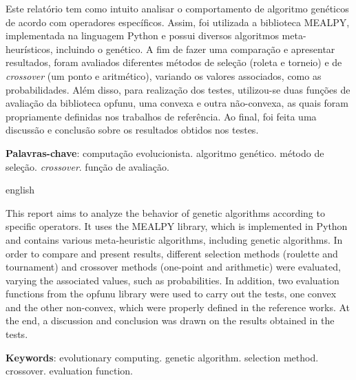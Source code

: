 \begin{resumoumacoluna}
    Este relatório tem como intuito analisar o comportamento de algoritmo genéticos de acordo com operadores específicos. Assim, foi utilizada a biblioteca MEALPY, implementada na linguagem Python e possui diversos algoritmos meta-heurísticos, incluindo o genético. A fim de fazer uma comparação e apresentar resultados, foram avaliados diferentes métodos de seleção (roleta e torneio) e de \textit{crossover} (um ponto e aritmético), variando os valores associados, como as probabilidades. Além disso, para realização dos testes, utilizou-se duas funções de avaliação da biblioteca opfunu, uma convexa e outra não-convexa, as quais foram propriamente definidas nos trabalhos de referência. Ao final, foi feita uma discussão e conclusão sobre os resultados obtidos nos testes.

    \noindent
    \textbf{Palavras-chave}: computação evolucionista. algoritmo genético. método de seleção. \textit{crossover}. função de avaliação.
\end{resumoumacoluna}

\renewcommand{\resumoname}{Abstract}
\begin{resumoumacoluna}
    \begin{otherlanguage*}{english}
    
        This report aims to analyze the behavior of genetic algorithms according to specific operators. It uses the MEALPY library, which is implemented in Python and contains various meta-heuristic algorithms, including genetic algorithms. In order to compare and present results, different selection methods (roulette and tournament) and crossover methods (one-point and arithmetic) were evaluated, varying the associated values, such as probabilities. In addition, two evaluation functions from the opfunu library were used to carry out the tests, one convex and the other non-convex, which were properly defined in the reference works. At the end, a discussion and conclusion was drawn on the results obtained in the tests.

        \vspace{\onelineskip}

        \noindent
        \textbf{Keywords}: evolutionary computing. genetic algorithm. selection method. crossover. evaluation function.
    \end{otherlanguage*}
\end{resumoumacoluna}
